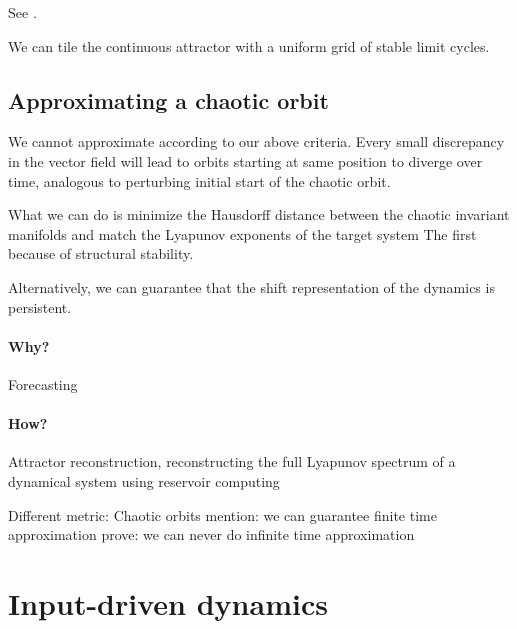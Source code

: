 \documentclass{article}
\theoremstyle{definition}
\theoremstyle{remark}
\newcounter{ct}
\begin{document}
See \citep{Sagodi2024a}.


We can tile the continuous attractor with a uniform grid of stable limit cycles.





\subsection{Approximating a chaotic orbit}
We cannot approximate according to our above criteria.
Every small discrepancy in the vector field will lead to orbits starting at same position to diverge over time, analogous to perturbing initial start of the chaotic orbit.


What we can do is minimize the Hausdorff distance between the chaotic invariant manifolds and match the Lyapunov exponents of the target system
The first because of structural stability.


Alternatively, we can guarantee that the shift representation of the dynamics is persistent.

\paragraph{Why?} 
Forecasting
\citep{jaeger2004harnessing}
\citep{fan2020long}
\citep{vlachas2020backpropagation}
\citep{grigoryeva2024forecasting}

\paragraph{How?}
Attractor reconstruction, reconstructing the full Lyapunov spectrum of a dynamical system using reservoir computing \citep{hart2024attractor}

Different metric: Chaotic orbits
mention: we can guarantee finite time approximation
prove: we can never do infinite time approximation 



\section{Input-driven dynamics}
\end{document}
